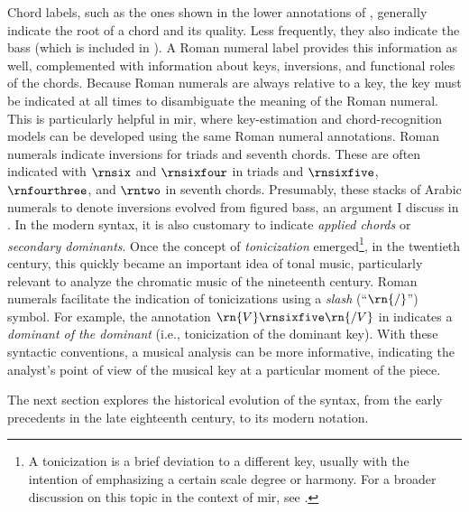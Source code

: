 

Chord labels, such as the ones shown in the lower
annotations of , generally indicate the root
of a chord and its quality. Less frequently, they also
indicate the bass (which is included in ). A
Roman numeral label provides this information as well,
complemented with information about keys, inversions, and
functional roles of the chords. Because Roman numerals are
always relative to a key, the key must be indicated at all
times to disambiguate the meaning of the Roman numeral. This
is particularly helpful in \gls{mir}, where key-estimation
and chord-recognition models can be developed using the same
Roman numeral annotations. Roman numerals indicate
inversions for triads and seventh chords. These are often
indicated with $\rnsix$ and $\rnsixfour$ in triads and
$\rnsixfive$, $\rnfourthree$, and $\rntwo$ in seventh
chords. Presumably, these stacks of Arabic numerals to
denote inversions evolved from figured bass, an argument I
discuss in . In the
modern syntax, it is also customary to indicate
\emph{applied chords} or \emph{secondary dominants}. Once
the concept of \emph{tonicization} emerged\footnote{A
tonicization is a brief deviation to a different key,
usually with the intention of emphasizing a certain scale
degree or harmony. For a broader discussion on this topic in
the context of \gls{mir}, see
\textcite{napoleslopez2020local}.}, in the twentieth
century, this quickly became an important idea of tonal
music, particularly relevant to analyze the chromatic music
of the nineteenth century. Roman numerals facilitate the
indication of tonicizations using a \emph{slash}
(``$\rn{/}$'') symbol. For example, the annotation
$\rn{V}\rnsixfive\rn{/V}$ in  indicates a
\emph{dominant of the dominant} (i.e., tonicization of the
dominant key). With these syntactic conventions, a musical
analysis can be more informative, indicating the analyst's
point of view of the musical key at a particular moment of
the piece.

The next section explores the historical evolution of the
syntax, from the early precedents in the late eighteenth
century, to its modern notation.

